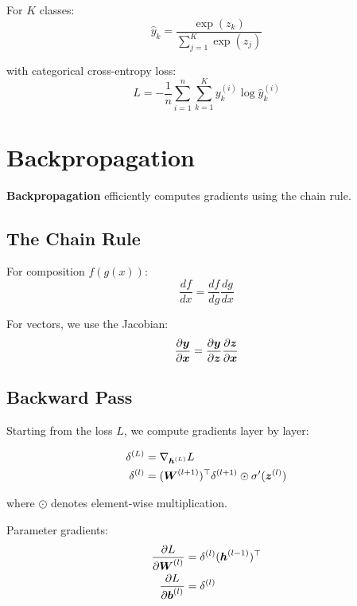 For $K$ classes:
\begin{equation}
\hat{y}_k = \frac{\exp(z_k)}{\sum_{j=1}^{K} \exp(z_j)}
\end{equation}

with categorical cross-entropy loss:
\begin{equation}
L = -\frac{1}{n} \sum_{i=1}^{n} \sum_{k=1}^{K} y_k^{(i)} \log \hat{y}_k^{(i)}
\end{equation}

\section{Backpropagation}
\label{sec:backpropagation}

\textbf{Backpropagation} efficiently computes gradients using the chain rule.

\subsection{The Chain Rule}

For composition $f(g(x))$:
\begin{equation}
\frac{df}{dx} = \frac{df}{dg} \frac{dg}{dx}
\end{equation}

For vectors, we use the Jacobian:
\begin{equation}
\frac{\partial \boldsymbol{y}}{\partial \boldsymbol{x}} = \frac{\partial \boldsymbol{y}}{\partial \boldsymbol{z}} \frac{\partial \boldsymbol{z}}{\partial \boldsymbol{x}}
\end{equation}

\subsection{Backward Pass}

Starting from the loss $L$, we compute gradients layer by layer:

\begin{align}
\delta^{(L)} &= \nabla_{\boldsymbol{h}^{(L)}} L \\
\delta^{(l)} &= (\boldsymbol{W}^{(l+1)})^\top \delta^{(l+1)} \odot \sigma'(\boldsymbol{z}^{(l)})
\end{align}

where $\odot$ denotes element-wise multiplication.

Parameter gradients:
\begin{align}
\frac{\partial L}{\partial \boldsymbol{W}^{(l)}} &= \delta^{(l)} (\boldsymbol{h}^{(l-1)})^\top \\
\frac{\partial L}{\partial \boldsymbol{b}^{(l)}} &= \delta^{(l)}
\end{align}

